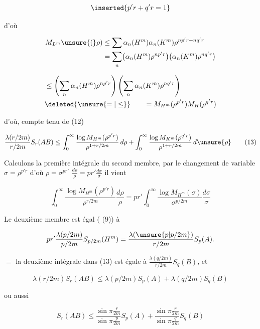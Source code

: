 \[
\inserted{p'r+q'r=1}
\]

d'où

\[
\begin{aligned}
M_{L^m}\unsure{(}\rho)&\leq\sum\alpha_n(H^m)\alpha_n(K^m)\rho^{np'r+nq'r}\\
&=\sum_n\bigl(\alpha_n(H^m)\rho^{np'r}\bigr)
\bigl(\alpha_n(K^m)\rho^{nq'r}\bigr)
\end{aligned}
\]

\[
\begin{aligned}
&\leq\left(\sum_n\alpha_n(H^m)\rho^{np'r}\right)
\left(\sum_n\alpha_n(K^m)\rho^{nq'r}\right)\\
&\deleted{\unsure{=|\leq}}\qquad=M_{H^m}(\rho^{p'r})M_H(\rho^{q'r})
\end{aligned}
\]

d'où, compte tenu de (12)

\[
\frac{\lambda(r/2m)}{r/2m}S_r(AB)\leq
\int_0^\infty\frac{\log M_{H^m}(\rho^{p'r})}{\rho^{1+r/2m}}\,d\rho+
\int_0^\infty\frac{\log M_{K^m}(\rho^{q'r})}{\rho^{1+r/2m}}\,d\unsure{\rho}
\tag*{(13)}
\]

Calculons  la première intégrale du second membre, par le changement de variable $\sigma=\rho^{p'r}$ d'où $\rho=\sigma^{pr'}$ $\frac{d\rho}{\rho}=pr'\frac{d\sigma}{\sigma}$ il vient

\[
\int_0^\infty\frac{\log M_{H^m}(\rho^{p'r})}{\rho^{r/2m}}\frac{d\rho}{\rho}
=pr'\int_0^\infty\frac{\log M_{H^m}(\sigma)}{\sigma^{p/2m}}\frac{d\sigma}{\sigma}
\]

Le deuxième membre est égal ( (9)) à

\[
pr'\frac{\lambda(p/2m)}{p/2m}S_{p/2m}(H^m)=\frac{\lambda(\unsure{p|p/2m})}{r/2m}S_p(A).
\]

 $=$ la deuxième intégrale dans (13) est égale à $\frac{\lambda(q/2m)}{r/2m}S_q(B)$, et  

\[
\lambda(r/2m)S_r(AB)\leq\lambda(p/2m)S_p(A)+\lambda(q/2m)S_q(B)
\]

ou aussi

\[
S_r(AB)\leq\frac{\sin\pi\frac{r}{2m}}{\sin\pi\frac{p}{2m}}S_p(A)+
\frac{\sin\pi\frac{r}{2m}}{\sin\pi\frac{q}{2m}}S_q(B)
\]


